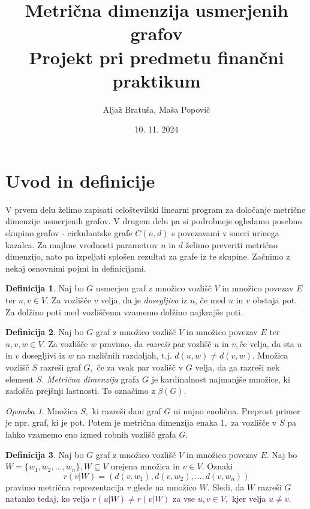\documentclass[a4paper,12pt]{article}
\title{
  Metrična dimenzija usmerjenih grafov \\
  \large Projekt pri predmetu finančni praktikum\\}
\author{Aljaž Bratuša, Maša Popovič}
\date{10. 11. 2024}
\theoremstyle{definition}
\newtheorem{definicija}{Definicija}[section]
\theoremstyle{remark}
\newtheorem*{opomba}{Opomba}
\theoremstyle{definition}
\begin{document}
\maketitle

\section{Uvod in definicije}

V prvem delu želimo zapisati celoštevilski linearni program za določanje metrične dimenzije usmerjenih grafov. V drugem delu 
pa si podrobneje ogledamo posebno skupino grafov - cirkulantske grafe $C(n, d)$ s povezavami v smeri
urinega kazalca. Za majhne vrednosti parametrov $n$ in  $d$ želimo preveriti metrično dimenzijo, nato 
pa izpeljati splošen rezultat za grafe iz te skupine. Začnimo z nekaj osnovnimi pojmi
in definicijami. 

\begin{definicija}
    Naj bo $G$ usmerjen graf z množico vozlišč $V$ in 
    množico povezav $E$ ter $u,v \in V.$ Za vozlišče $v$ velja, da je \textit{dosegljivo}
    iz $u$, če med $u$ in $v$ obstaja pot. Za dolžino poti med vozliščema vzamemo dolžino
    najkrajše poti.
\end{definicija}

\begin{definicija}
    Naj bo $G$ graf z množico vozlišč $V$ in množico povezav $E$ ter $u,v,w \in V.$ Za vozlišče 
    $w$ pravimo, da \textit{razreši} par vozlišč $u$ in $v,$če velja, da sta $u$ in $v$ dosegljivi
    iz $w$ na različnih razdaljah, t.j. $d(u,w) \neq d(v,w).$ Množica vozlišč $S$ razreši graf $G,$ če 
    za vsak par vozlišč v $G$ velja, da ga razreši nek element $S.$ \textit{Metrična dimenzija} grafa $G$
    je kardinalnost najmanjše množice, ki zadošča prejšnji lastnosti. To označimo z $\beta(G).$
\end{definicija}

\begin{opomba}
    Množica $S,$ ki razreši dani graf $G$ ni nujno enolična. Preprost primer je npr. graf, ki je pot. Potem je 
    metrična dimenzija enaka $1,$ za vozlišče v $S$ pa lahko vzamemo eno izmed robnih vozlišč grafa $G.$
\end{opomba}

\begin{definicija}
    Naj bo $G$ graf z množico vozlišč $V$ in množico povezav $E.$
    Naj bo $W = \{w_1, w_2, \dots ,w_n \},  W \subseteq V$ urejena množica in $v \in V.$
    Oznaki $$r(v|W) = (d(v, w_1), d(v, w_2), \dots ,d(v, w_n))$$ pravimo metrična 
    reprezentacija $v$ glede na množico $W.$ Sledi, da $W$ razreši $G$ natanko tedaj, ko velja 
    $r(u|W) \neq r(v|W)$ za vse $u,v \in V,$ kjer velja $u \neq v.$
\end{definicija}
\end{document}
